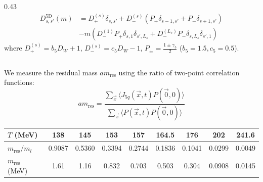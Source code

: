 \documentclass[10pt, aspectratio=169]{beamer} %
\begin{document}
\begin{frame}
\begin{columns}[c]
\begin{column}{0.43\textwidth}
        {\scriptsize
        \begin{align*}
            D^{\text{5D}}_{s,s'}(m) &= D_{+}^{(s)}\delta_{s,s'} + D_{-}^{(s)} (P_+ \delta_{s-1,s'} + P_- \delta_{s+1,s'}) \\
            &- m (D_{-}^{(1)} P_+ \delta_{s,1}\delta_{s',L_s} + D_{-}^{(L_s)} P_- \delta_{s,L_s}\delta_{s',1})
        \end{align*}
        where $D_{+}^{(s)} = b_5 D_W + 1$, $D_{-}^{(s)} = c_5 D_W - 1$, $P_\pm = \frac{1 \pm \gamma_5}{2}$ ($b_5=1.5, c_5=0.5$).
        }
    \end{column}
\end{columns}
\vfill
\end{frame}

\begin{frame}
\vfill
We measure the residual mass $am_{\text{res}}$ using the ratio of two-point correlation functions:
\[ am_{\text{res}} = \frac{\sum_{\vec{x}} \langle J_{5q}(\vec{x}, t) P(\vec{0}, 0) \rangle}{\sum_{\vec{x}} \langle P(\vec{x}, t) P(\vec{0}, 0) \rangle} \]

\vspace{0.8em}
\centering
\tiny
\setlength{\tabcolsep}{7.5pt}
\renewcommand{\arraystretch}{1.1}
\begin{tabular}{lcccccccc}
    \toprule
    $T$ (MeV) & 138 & 145 & 153 & 157 & 164.5 & 176 & 202 & 241.6 \\
    \midrule
    $m_{\text{res}}/m_l$ & 0.9087 & 0.5360 & 0.3394 & 0.2744 & 0.1836 & 0.1041 & 0.0299 & 0.0049 \\
    $m_{\text{res}}$ (MeV) & 1.61 & 1.16 & 0.832 & 0.703 & 0.503 & 0.304 & 0.0908 & 0.0145 \\
    \bottomrule
\end{tabular}
\vfill
\end{frame}
\end{document}
